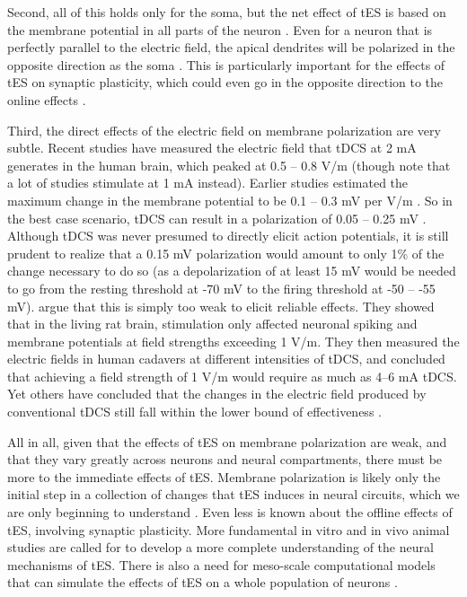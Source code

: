 \documentclass[11pt,english,]{memoir}
\begin{document}
Second, all of this holds only for the soma, but the net effect of tES is based on the membrane potential in all parts of the neuron \autocite{Jackson2016}. Even for a neuron that is perfectly parallel to the electric field, the apical dendrites will be polarized in the opposite direction as the soma \autocite{Bikson2019}. This is particularly important for the effects of tES on synaptic plasticity, which could even go in the opposite direction to the online effects \autocite{Kronberg2017}.

Third, the direct effects of the electric field on membrane polarization are very subtle. Recent studies have measured the electric field that tDCS at 2 mA generates in the human brain, which peaked at 0.5 \autocite{Opitz2016} -- 0.8 \autocite{Huang2017} V/m (though note that a lot of studies stimulate at 1 mA instead). Earlier studies estimated the maximum change in the membrane potential to be 0.1 \autocite{Bikson2004} -- 0.3 mV per V/m \autocite{Radman2009}. So in the best case scenario, tDCS can result in a polarization of 0.05 -- 0.25 mV \autocite{Bikson2019}. Although tDCS was never presumed to directly elicit action potentials, it is still prudent to realize that a 0.15 mV polarization would amount to only 1\% of the change necessary to do so (as a depolarization of at least 15 mV would be needed to go from the resting threshold at -70 mV to the firing threshold at -50 -- -55 mV). \textcite{Voroslakos2018} argue that this is simply too weak to elicit reliable effects. They showed that in the living rat brain, stimulation only affected neuronal spiking and membrane potentials at field strengths exceeding 1 V/m. They then measured the electric fields in human cadavers at different intensities of tDCS, and concluded that achieving a field strength of 1 V/m would require as much as 4--6 mA tDCS. Yet others have concluded that the changes in the electric field produced by conventional tDCS still fall within the lower bound of effectiveness \autocite{Huang2017}.

All in all, given that the effects of tES on membrane polarization are weak, and that they vary greatly across neurons and neural compartments, there must be more to the immediate effects of tES. Membrane polarization is likely only the initial step in a collection of changes that tES induces in neural circuits, which we are only beginning to understand \autocite{Liu2018}. Even less is known about the offline effects of tES, involving synaptic plasticity. More fundamental in vitro and in vivo animal studies are called for to develop a more complete understanding of the neural mechanisms of tES. There is also a need for meso-scale computational models that can simulate the effects of tES on a whole population of neurons \autocites{Bestmann2014}{Molaee-Ardekani2013}.
\end{document}
